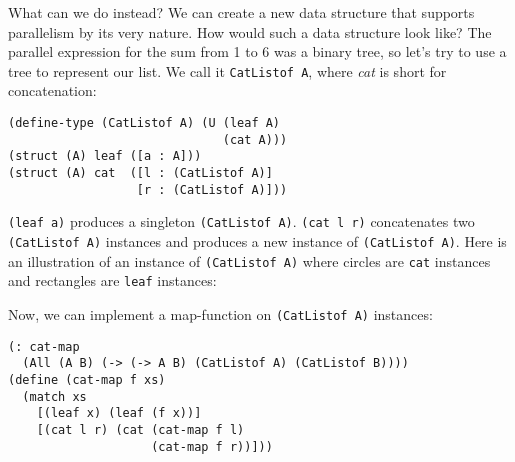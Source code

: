 \documentclass{article}
\begin{document}
What can we do instead? We can create a new data structure that supports parallelism by its very nature. How would such a data structure look like? The parallel expression for the sum from 1 to 6 was a binary tree, so let's try to use a tree to represent our list. We call it \lstinline{CatListof A}, where \emph{cat} is short for concatenation:

\begin{lstlisting}
(define-type (CatListof A) (U (leaf A)
                              (cat A)))
(struct (A) leaf ([a : A]))
(struct (A) cat  ([l : (CatListof A)]
                  [r : (CatListof A)]))
\end{lstlisting}

\lstinline{(leaf a)} produces a singleton \lstinline{(CatListof A)}. \lstinline{(cat l r)} concatenates two \lstinline{(CatListof A)} instances and produces a new instance of \lstinline{(CatListof A)}. Here is an illustration of an instance of \lstinline{(CatListof A)} where circles are \lstinline{cat} instances and rectangles are \lstinline{leaf} instances:

\begin{center}
\end{center}

Now, we can implement a map-function on \lstinline{(CatListof A)} instances:

\begin{lstlisting}
(: cat-map
  (All (A B) (-> (-> A B) (CatListof A) (CatListof B))))
(define (cat-map f xs)
  (match xs
    [(leaf x) (leaf (f x))]
    [(cat l r) (cat (cat-map f l)
                    (cat-map f r))]))
\end{lstlisting}
\end{document}
